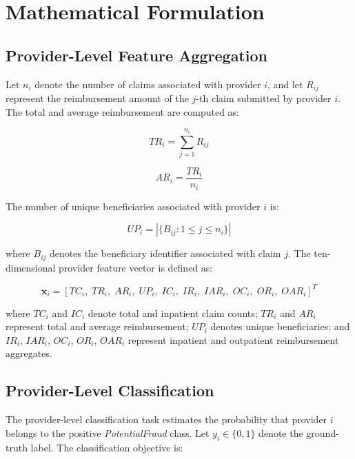 \section{Mathematical Formulation}
\label{sec:mathform}

\subsection{Provider-Level Feature Aggregation}

Let $n_i$ denote the number of claims associated with provider $i$, and let $R_{ij}$ represent the reimbursement amount of the $j$-th claim submitted by provider $i$. The total and average reimbursement are computed as:

\begin{equation}
\label{eq:total-reimb}
TR_i = \sum_{j=1}^{n_i} R_{ij}
\end{equation}

\begin{equation}
\label{eq:avg-reimb}
AR_i = \frac{TR_i}{n_i}
\end{equation}

The number of unique beneficiaries associated with provider $i$ is:

\begin{equation}
\label{eq:unique-patients}
UP_i = \left| \{ B_{ij} : 1 \leq j \leq n_i \} \right|
\end{equation}

where $B_{ij}$ denotes the beneficiary identifier associated with claim $j$. The ten-dimensional provider feature vector is defined as:

\begin{equation}
\label{eq:feature-vector}
\mathbf{x}_i = [TC_i,\; TR_i,\; AR_i,\; UP_i,\; IC_i,\; IR_i,\; IAR_i,\; OC_i,\; OR_i,\; OAR_i]^T
\end{equation}

where $TC_i$ and $IC_i$ denote total and inpatient claim counts; $TR_i$ and $AR_i$ represent total and average reimbursement; $UP_i$ denotes unique beneficiaries; and $IR_i$, $IAR_i$, $OC_i$, $OR_i$, $OAR_i$ represent inpatient and outpatient reimbursement aggregates.

\subsection{Provider-Level Classification}

The provider-level classification task estimates the probability that provider $i$ belongs to the positive \textit{PotentialFraud} class. Let $y_i \in \{0, 1\}$ denote the ground-truth label. The classification objective is:

